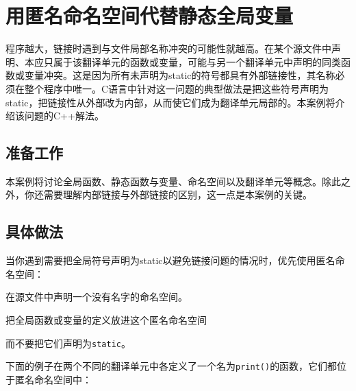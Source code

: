 
\section{用匿名命名空间代替静态全局变量}



程序越大，链接时遇到与文件局部名称冲突的可能性就越高。在某个源文件中声明、本应只属于该翻译单元的函数或变量，可能与另一个翻译单元中声明的同类函数或变量冲突。这是因为所有未声明为static的符号都具有外部链接性，其名称必须在整个程序中唯一。C语言中针对这一问题的典型做法是把这些符号声明为static，把链接性从外部改为内部，从而使它们成为翻译单元局部的。本案例将介绍该问题的C++解法。



\subsection{准备工作}



本案例将讨论全局函数、静态函数与变量、命名空间以及翻译单元等概念。除此之外，你还需要理解内部链接与外部链接的区别，这一点是本案例的关键。



\subsection{具体做法}



当你遇到需要把全局符号声明为static以避免链接问题的情况时，优先使用匿名命名空间：



在源文件中声明一个没有名字的命名空间。



把全局函数或变量的定义放进这个匿名命名空间



而不要把它们声明为\texttt{static}。



下面的例子在两个不同的翻译单元中各定义了一个名为\texttt{print()}的函数，它们都位于匿名命名空间中：



